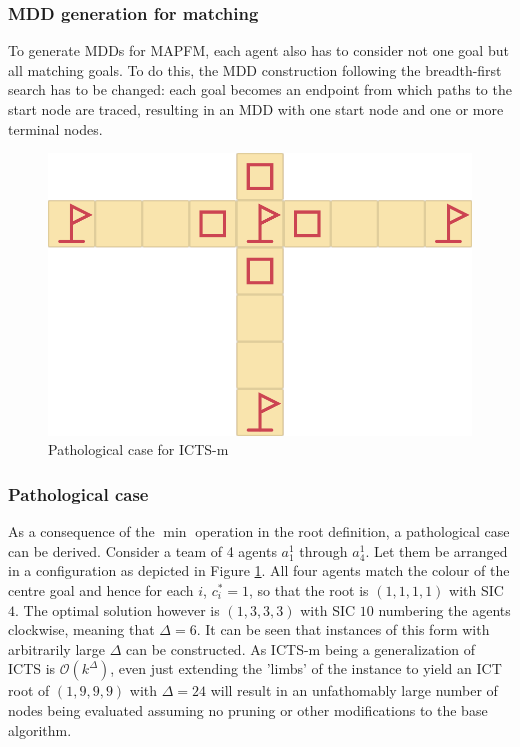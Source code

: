 \documentclass[english]{article}
\begin{document}
	\subsubsection{MDD generation for matching}
	To generate MDDs for MAPFM, each agent also has to consider not one goal but all matching goals. To do this, the MDD construction following the breadth-first search has to be changed: each goal becomes an endpoint from which paths to the start node are traced, resulting in an MDD with one start node and one or more terminal nodes.
	\begin{figure}
		\centering
		\includegraphics[width=\linewidth]{img/path}
		\caption{Pathological case for ICTS-m}
		\label{fig:path}
	\end{figure}
	\subsubsection{Pathological case}
	\label{pathology}
	As a consequence of the $\min$ operation in the root definition, a pathological case can be derived. Consider a team of 4 agents $a_1^1$ through $a_4^1$. Let them be arranged in a configuration as depicted in Figure \ref{fig:path}. All four agents match the colour of the centre goal and hence for each $i$, $c^*_i = 1$, so that the root is $(1,1,1,1)$ with SIC $4$. The optimal solution however is $(1,3,3,3)$ with SIC $10$ numbering the agents clockwise, meaning that $\Delta = 6$. It can be seen that instances of this form with arbitrarily large $\Delta$ can be constructed. As ICTS-m being a generalization of ICTS is $\mathcal{O}(k^\Delta)$, even just extending the 'limbs' of the instance to yield an ICT root of $(1,9,9,9)$ with $\Delta = 24$ will result in an unfathomably large number of nodes being evaluated assuming no pruning or other modifications to the base algorithm.
	
\end{document}
